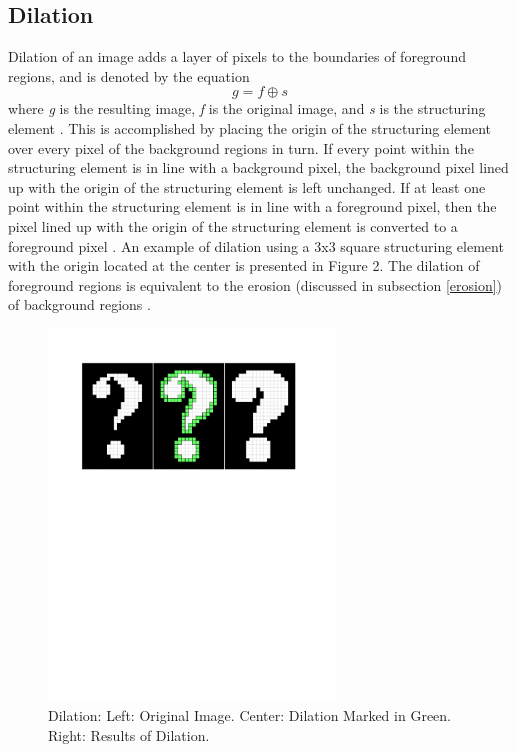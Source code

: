 \documentclass{sig-alternate}
\begin{document}
\subsection{Dilation}\label{dilation}
Dilation of an image adds a layer of pixels to the boundaries of foreground regions, and is denoted by the equation
\begin{equation*}
g = f \oplus s
\end{equation*}
where \textit{g} is the resulting image, \textit{f} is the original image, and \textit{s} is the structuring element \cite{MorphologyWikiAnonymous, MorphologyBook:2000}. This is accomplished by placing the origin of the structuring element over every pixel of the background regions in turn. If every point within the structuring element is in line with a background pixel, the background pixel lined up with the origin of the structuring element is left unchanged. If at least one point within the structuring element is in line with a foreground pixel, then the pixel lined up with the origin of the structuring element is converted to a foreground pixel \cite{MorphologyWiki}. An example of dilation using a 3x3 square structuring element with the origin located at the center is presented in Figure 2. The dilation of foreground regions is equivalent to the erosion (discussed in subsection \ref{erosion}) of background regions \cite{MorphologyWiki}.
\begin{figure}
\centering
\includegraphics[width=3in,trim={0 6.75in 0 0},clip]{dilation}
\caption{Dilation: Left: Original Image. Center: Dilation Marked in Green. Right: Results of Dilation.}
\end{figure}
\end{document}
